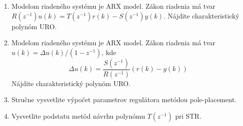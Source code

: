 \documentclass[a4paper, 10pt, ]{article}
\begin{document}
\begin{enumerate}[leftmargin=0pt, labelsep=4mm, itemsep=0pt]

	\item Modelom riadeného systému je ARX model. Zákon riadenia má tvar $R(z^{-1}) u(k) =  T(z^{-1}) r(k) -  S(z^{-1}) y(k)$. Nájdite charakteristický polynóm URO.

	\item Modelom riadeného systému je ARX model. Zákon riadenia má tvar $ u(k) =  \Delta u(k) / (1 - z^{-1})$, kde
	\begin{equation*}
		\Delta u(k) = \frac{S(z^{-1})}{R(z^{-1})} (r(k) - y(k))
	\end{equation*}
		Nájdite charakteristický polynóm URO.

	\item Stručne vysvetlite výpočet parametrov regulátora metódou pole-placement.

	\item Vysvetlite podstatu metód návrhu polynómu $T(z^{-1})$ pri STR.

\end{enumerate}
\end{document}

